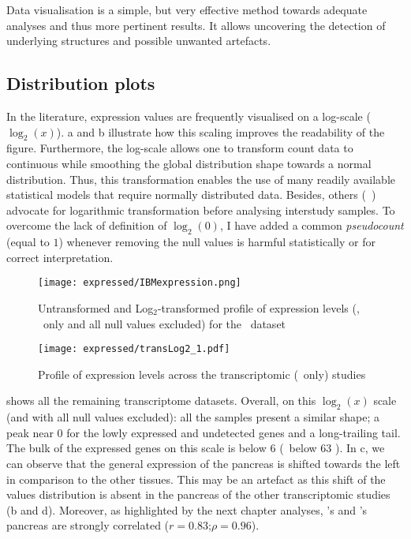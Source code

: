 Data visualisation is a simple, but very effective method
towards adequate analyses and thus more pertinent results.
It allows uncovering the detection of underlying structures
and possible unwanted artefacts.

\subsection{Distribution plots}\label{subsec:distribPlot}
\vspace{-0.2in}
In the literature, expression values are frequently
visualised on a log-scale ($\log_{2}(x)$).
a and b illustrate how
this scaling improves the readability of the figure.
Furthermore, the log-scale allows one to transform count data to continuous
while smoothing the global distribution shape towards a normal distribution.
Thus, this transformation enables
the use of many readily available statistical models
that require normally distributed data.
Besides, others (\eg{}~\cite{Danielsson2015-cn}) advocate
for logarithmic transformation before analysing interstudy samples.
To overcome the lack of definition of $\log_{2}(0)$,
I have added a common \emph{pseudocount} (equal to $1$)
whenever removing the null values is harmful statistically
or for correct interpretation.

\begin{figure}[!htbp]
    \centering
    \texttt{[image: expressed/IBMexpression.png]}
    \caption{Untransformed and Log$_{2}$-transformed profile
    of expression levels (\FPKM, \pcgs\ only and all null values excluded)
    for the \ibm\ dataset}\label{fig:distribPlot}
\end{figure}

\begin{figure}[!htbp]
    \centering
    \texttt{[image: expressed/transLog2\_1.pdf]}
    \caption{Profile of expression levels across the transcriptomic (\pcgs\ only) studies
    }\label{fig:distribTrans}
\end{figure}

 shows all the remaining transcriptome datasets.
Overall,
on this $\log_{2}(x)$ scale (and with all null values excluded):
all the samples present a similar shape;
a peak near $0$ for the lowly expressed and undetected genes and a long-trailing tail.
The bulk of the expressed genes on this scale is below $6$ (\ie\ below 63 \FPKM).
In c, we can observe that the general expression
of the pancreas is shifted towards the left in comparison to the other tissues.
This may be an artefact as this shift of the values distribution
is absent in the pancreas of the other transcriptomic studies
(b and d).
Moreover, as highlighted by the next chapter analyses,
\uhlen's and  \gtex's pancreas are strongly
correlated ($r = 0.83$;$\rho = 0.96$).

